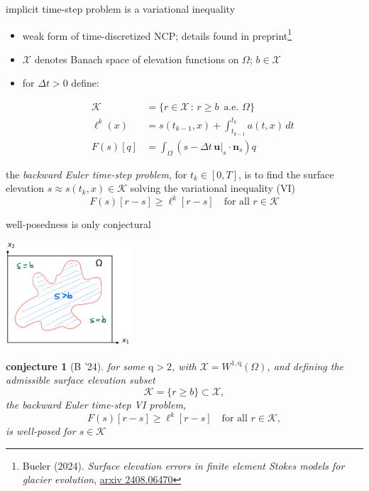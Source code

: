 \documentclass[10pt,svgnames]{beamer}
\newtheorem*{conjecture}{conjecture}
\newcommand{\bn}{\mathbf{n}}
\newcommand{\bu}{\mathbf{u}}
\newcommand{\cK}{\mathcal{K}}
\newcommand{\cX}{\mathcal{X}}
\newcommand{\qq}{\mathrm{q}}
\begin{document}
\begin{frame}{implicit time-step problem is a variational inequality}

\begin{itemize}
\item weak form of time-discretized NCP; details found in preprint\footnote{Bueler (2024). \emph{Surface elevation errors in finite element Stokes models for glacier evolution}, \href{https://www.arxiv.org/abs/2408.06470}{arxiv 2408.06470}}
\item $\cX$ denotes Banach space of elevation functions on $\Omega$; $b\in\cX$
\item for $\Delta t > 0$ define:

\vspace{-7mm}
\begin{align*}
\cK &= \{r \in \cX\,:\, r \ge b \,\text{ a.e. } \Omega\} \\
\ell^k(x) &= s(t_{k-1},x) + \int_{t_{k-1}}^{t_k} a(t,x)\,dt \\
F(s)[q] &= \int_\Omega (s - \Delta t\,\bu|_s \cdot \bn_s) q 
\end{align*}
\end{itemize}

\medskip
\begin{definition}
the \emph{backward Euler time-step problem}, for $t_k \in [0,T]$, is to find the surface elevation $s \approx s(t_k,x) \in \cK$ solving the variational inequality (VI)
$$F(s)[r-s] \ge \ell^k[r-s] \quad \text{for all } r \in \cK$$
\end{definition}

\bigskip
\end{frame}


\begin{frame}{well-posedness is only conjectural}

\hfill \includegraphics[width=0.35\textwidth]{mapplane}

\begin{conjecture}[B '24]
for some $\qq>2$, with $\cX = W^{1,\qq}(\Omega)$, and defining the admissible surface elevation subset
    $$\cK = \{r \ge b\} \subset \cX,$$
the backward Euler time-step VI problem,
    $$F(s)[r-s] \ge \ell^k[r-s] \quad \text{for all } r \in \cK,$$
is well-posed for $s\in\cK$
\end{conjecture}
\end{frame}
\end{document}

